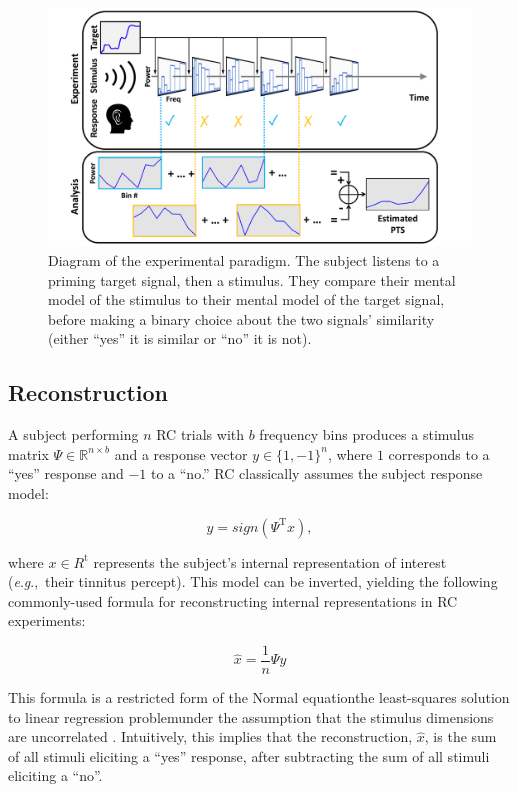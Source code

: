 \documentclass[journal]{IEEEtran}
\newcommand{\eg}{\textit{e}.\textit{g}.,\ }
\begin{document}
\begin{figure}[t]
  \centering
  \includegraphics[width=\linewidth]{experiment_overview.pdf}
  \caption{Diagram of the experimental paradigm. The subject listens to a priming target signal,
then a stimulus. They compare their mental model of the stimulus to their mental model of the target signal,
before making a binary choice about the two signals' similarity (either ``yes'' it is similar or ``no'' it is not).}
  \label{fig:experimentdiagram}
\end{figure}

\subsection{Reconstruction}

A subject performing $n$ RC trials with $b$ frequency bins produces a stimulus matrix $\Psi \in \mathbb{R}^{n \times b}$
and a response vector $y \in \{1,-1\}^n$,
where $1$ corresponds to a ``yes'' response and $-1$ to a ``no.'' RC classically assumes the subject response model:

\begin{equation}
  y = sign(\Psi^\mathrm{T} x), 
\end{equation}

where $x \in R^\mathrm{t}$ represents the subject's internal representation of interest (\eg their tinnitus percept).
This model can be inverted, yielding the following commonly-used formula for reconstructing internal representations in RC experiments:

\begin{equation}
  \hat{x} = \frac{1}{n} \Psi y
  \label{eq:linreg}
\end{equation}

This formula is a restricted form of the Normal equation\textemdash{}the least-squares solution to linear regression problem\textemdash{}under
the assumption that the stimulus dimensions are uncorrelated \cite{martinCombinabilityInformationUncorrelated1966, gosselinSuperstitiousPerceptionsReveal2003}.
Intuitively, this implies that the reconstruction, $\hat{x}$, is the sum of all stimuli eliciting a ``yes'' response, after subtracting the sum of all stimuli eliciting a ``no''. 
\end{document}
